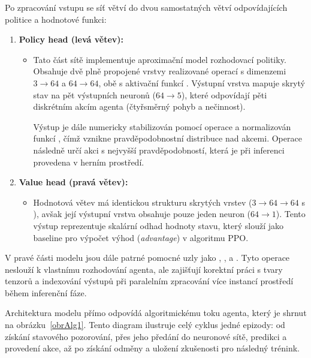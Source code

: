 Po zpracování vstupu se síť větví do dvou samostatných větví odpovídajících politice a hodnotové funkci:

\begin{enumerate}
    \item \textbf{Policy head (levá větev):}
    \begin{itemize}
        \item Tato část sítě implementuje aproximační model rozhodovací politiky. Obsahuje dvě plně propojené vrstvy realizované operací  s dimenzemi $3 \rightarrow 64$ a $64 \rightarrow 64$, obě s aktivační funkcí . Výstupní vrstva mapuje skrytý stav na pět výstupních neuronů ($64 \rightarrow 5$), které odpovídají pěti diskrétním akcím agenta (čtyřsměrný pohyb a nečinnost).
        
        Výstup je dále numericky stabilizován pomocí operace  a normalizován funkcí , čímž vznikne pravděpodobnostní distribuce nad akcemi. Operace  následně určí akci s nejvyšší pravděpodobností, která je při inferenci provedena v herním prostředí.
    \end{itemize}

    \item \textbf{Value head (pravá větev):}
    \begin{itemize}
        \item Hodnotová větev má identickou strukturu skrytých vrstev ($3 \rightarrow 64 \rightarrow 64$ s ), avšak její výstupní vrstva obsahuje pouze jeden neuron ($64 \rightarrow 1$). Tento výstup reprezentuje skalární odhad hodnoty stavu, který slouží jako baseline pro výpočet výhod (\emph{advantage}) v algoritmu PPO.
    \end{itemize}
\end{enumerate}

V pravé části modelu jsou dále patrné pomocné uzly jako , ,  a . Tyto operace neslouží k vlastnímu rozhodování agenta, ale zajišťují korektní práci s tvary tenzorů a indexování výstupů při paralelním zpracování více instancí prostředí během inferenční fáze.

Architektura modelu přímo odpovídá algoritmickému toku agenta, který je shrnut na obrázku~\ref{obrAlg1}. Tento diagram ilustruje celý cyklus jedné epizody: od získání stavového pozorování, přes jeho předání do neuronové sítě, predikci a provedení akce, až po získání odměny a uložení zkušenosti pro následný trénink.

